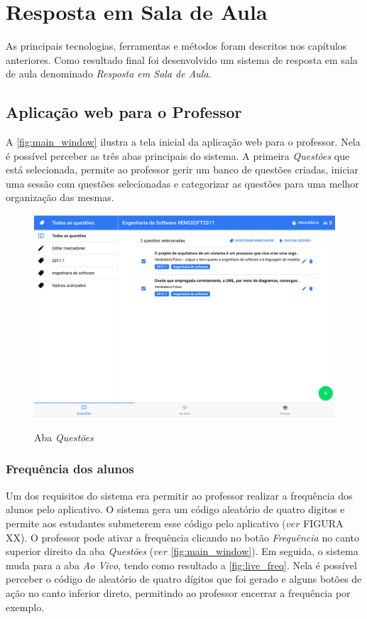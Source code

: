 \chapter{Resposta em Sala de Aula}

As principais tecnologias, ferramentas e métodos foram descritos nos capítulos
anteriores. Como resultado final foi desenvolvido um sistema de resposta
em sala de aula denominado \textit{Resposta em Sala de Aula}.

\section{Aplicação web para o Professor}

A \autoref{fig:main_window} ilustra a tela inicial da aplicação web para o professor.
Nela é possível perceber as três abas principais do sistema. A primeira \textit{Questões} que
está selecionada, permite ao professor gerir um banco de questões criadas, iniciar uma
sessão com questões selecionadas e categorizar as questões para uma melhor organização das mesmas.

\begin{figure}[h]
  \centering
  \caption{Aba \textit{Questões}}
  \includegraphics[scale=.40]{imagens/telas/main_window}
  \doautor
  \label{fig:main_window}
\end{figure}

\subsection{Frequência dos alunos}
\label{sec:freq_students}

Um dos requisitos do sistema era permitir ao professor realizar a frequência dos alunos
pelo aplicativo. O sistema gera um código aleatório de quatro digitos e permite aos estudantes
submeterem esse código pelo aplicativo ($ver$ FIGURA XX). O professor pode ativar a frequência
clicando no botão \textit{Frequência} no canto superior direito da aba \textit{Questões} ($ver$ \autoref{fig:main_window}).
Em seguida, o sistema muda para a aba \textit{Ao Vivo}, tendo como resultado a \autoref{fig:live_freq}.
Nela é possível perceber o código de aleatório de quatro dígitos que foi gerado e alguns botões de ação no canto
inferior direto, permitindo ao professor encerrar a frequência por exemplo.

